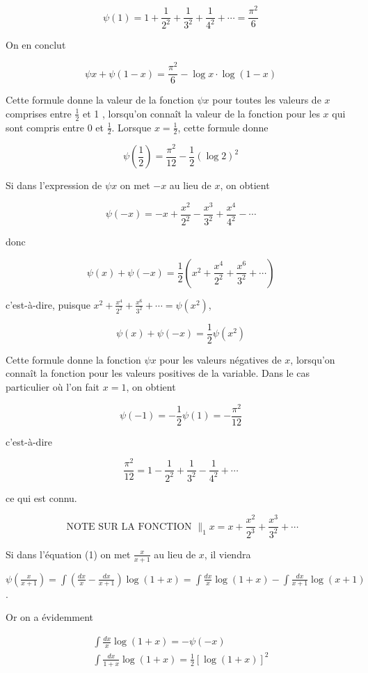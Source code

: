 \documentclass{article}
\begin{document}
\[
\psi(1)=1+\frac{1}{2^{2}}+\frac{1}{3^{2}}+\frac{1}{4^{2}}+\cdots=\frac{\pi^{2}}{6}
\]

On en conclut

\[
\psi x+\psi(1-x)=\frac{\pi^{2}}{6}-\log x \cdot \log (1-x)
\]

Cette formule donne la valeur de la fonction \(\psi x\) pour toutes les valeurs de \(x\) comprises entre \(\frac{1}{2}\) et 1 , lorsqu'on connaît la valeur de la fonction pour les \(x\) qui sont compris entre 0 et \(\frac{1}{2}\). Lorsque \(x=\frac{1}{2}\), cette formule donne

\[
\psi\left(\frac{1}{2}\right)=\frac{\pi^{2}}{12}-\frac{1}{2}(\log 2)^{2}
\]

Si dans l'expression de \(\psi x\) on met \(-x\) au lieu de \(x\), on obtient

\[
\psi(-x)=-x+\frac{x^{2}}{2^{2}}-\frac{x^{3}}{3^{2}}+\frac{x^{4}}{4^{2}}-\cdots
\]

donc

\[
\psi(x)+\psi(-x)=\frac{1}{2}\left(x^{2}+\frac{x^{4}}{2^{2}}+\frac{x^{6}}{3^{2}}+\cdots\right)
\]

c'est-à-dire, puisque \(x^{2}+\frac{x^{4}}{2^{2}}+\frac{x^{6}}{3^{2}}+\cdots=\psi\left(x^{2}\right)\),

\[
\psi(x)+\psi(-x)=\frac{1}{2} \psi\left(x^{2}\right)
\]

Cette formule donne la fonction \(\psi x\) pour les valeurs négatives de \(x\), lorsqu'on connaît la fonction pour les valeurs positives de la variable. Dans le cas particulier où l'on fait \(x=1\), on obtient

\[
\psi(-1)=-\frac{1}{2} \psi(1)=-\frac{\pi^{2}}{12}
\]

c'est-à-dire

\[
\frac{\pi^{2}}{12}=1-\frac{1}{2^{2}}+\frac{1}{3^{2}}-\frac{1}{4^{2}}+\cdots
\]

ce qui est connu.

\[
\text { NOTE SUR LA FONCTION } \|_{1} x=x+\frac{x^{2}}{2^{3}}+\frac{x^{3}}{3^{2}}+\cdots
\]

Si dans l'équation (1) on met \(\frac{x}{x+1}\) au lieu de \(x\), il viendra

\(\psi\left(\frac{x}{x+1}\right)=\int\left(\frac{d x}{x}-\frac{d x}{x+1}\right) \log (1+x)=\int \frac{d x}{x} \log (1+x)-\int \frac{d x}{x+1} \log (x+1)\).

Or on a évidemment

\[
\begin{gathered}
\int \frac{d x}{x} \log (1+x)=-\psi(-x) \\
\int \frac{d x}{1+x} \log (1+x)=\frac{1}{2}[\log (1+x)]^{2}
\end{gathered}
\]
\end{document}
